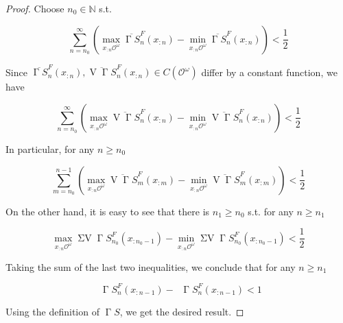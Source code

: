 \documentclass[11pt]{article}
\theoremstyle{definition}
\theoremstyle{plain}
\newcommand{\Nats}{\mathbb{N}}
\newcommand{\Ob}{\mathcal{O}}
\newcommand{\OO}{\Ob^\omega}
\newcommand{\CO}{C(\OO)}
\DeclareMathOperator{\V}{V}
\DeclareMathOperator{\SV}{\Sigma V}
\DeclareMathOperator{\SVM}{\Sigma V_{\min}}
\DeclareMathOperator{\SVX}{\Sigma V_{\max}}
\DeclareMathOperator{\PG}{\Gamma}
\begin{document}
\begin{proof}

Choose $n_0 \in \Nats$ s.t. 

$$\sum_{n=n_0}^\infty {(\max_{x_{:n}\OO} \overline{\PG{S}}^F_n(x_{:n})-\min_{x_{:n}\OO} \overline{\PG{S}}^F_n(x_{:n}))} < \frac{1}{2}$$

Since $\overline{\PG{S}}^F_n(x_{:n}), \overline{\V{\PG{S}}}^F_n(x_{:n}) \in \CO$ differ by a constant function, we have

$$\sum_{n=n_0}^\infty {(\max_{x_{:n}\OO} \overline{\V{\PG{S}}}^F_n(x_{:n})-\min_{x_{:n}\OO} \overline{\V{\PG{S}}}^F_n(x_{:n}))} < \frac{1}{2}$$

In particular, for any $n \geq n_0$

$$\sum_{m=n_0}^{n-1} {(\max_{x_{:n}\OO} \overline{\V{\PG{S}}}^F_m(x_{:m})-\min_{x_{:n}\OO} \overline{\V{\PG{S}}}^F_m(x_{:m}))} < \frac{1}{2}$$

On the other hand, it is easy to see that there is $n_1 \geq n_0$ s.t. for any $n \geq n_1$

$$\max_{x_{:n}\OO} \SV{\PG{S}}_{n_0}^F(x_{:n_0 - 1}) - \min_{x_{:n}\OO} \SV{\PG{S}}_{n_0}^F(x_{:n_0 - 1}) < \frac{1}{2}$$

Taking the sum of the last two inequalities, we conclude that for any $n \geq n_1$

$$\SVX{\PG{S}}_{n}^F(x_{:n-1}) - \SVM{\PG{S}}_{n}^F(x_{:n-1}) < 1$$

Using the definition of $\PG{S}$, we get the desired result.
\end{proof}
\end{document}
